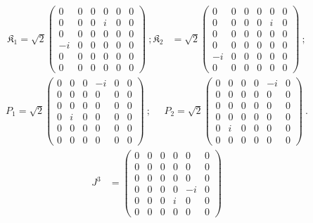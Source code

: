 \documentclass[%
 reprint,
superscriptaddress,
 amsmath,amssymb,
 aps,
]{revtex4-2}
\begin{document}
    \begin{align}
        \mathfrak{K}_1=\sqrt{2}\begin{pmatrix}
    0&0&0&0&0&0\\
    0&0&0&i&0&0\\
    0&0&0&0&0&0\\
    -i&0&0&0&0&0\\
    0&0&0&0&0&0\\
    0&0&0&0&0&0
    \end{pmatrix}~;
    \mathfrak{K}_2&=\sqrt{2}\begin{pmatrix}
    0&0&0&0&0&0\\
    0&0&0&0&i&0\\
    0&0&0&0&0&0\\
    0&0&0&0&0&0\\
    -i&0&0&0&0&0\\
    0&0&0&0&0&0
    \end{pmatrix}~;\nonumber
    \end{align}
    \begin{align}
        P_1=\sqrt{2}\begin{pmatrix}
    0&0&0&-i&0&0\\
    0&0&0&0&0&0\\
    0&0&0&0&0&0\\
    0&i&0&0&0&0\\
    0&0&0&0&0&0\\
    0&0&0&0&0&0
    \end{pmatrix}~;~~~~~~
    P_2=\sqrt{2}\begin{pmatrix}
    0&0&0&0&-i&0\\
    0&0&0&0&0&0\\
    0&0&0&0&0&0\\
    0&0&0&0&0&0\\
    0&i&0&0&0&0\\
    0&0&0&0&0&0
    \end{pmatrix}~.\nonumber
    \end{align}
    \begin{align}
        J^3&=\begin{pmatrix}
    0&0&0&0&0&0\\
    0&0&0&0&0&0\\
    0&0&0&0&0&0\\
  0&0&0&0 & -i & 0\\
  0&0&0&i & 0 & 0\\
  0&0&0&0 & 0 & 0
\end{pmatrix}\label{matrix-rep-conformal-generators}
    \end{align}
%
\end{document}
